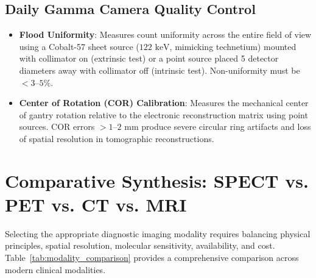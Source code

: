 \documentclass[11pt,a4paper]{article}
\begin{document}
\subsection{Daily Gamma Camera Quality Control}
\begin{itemize}
    \item \textbf{Flood Uniformity}: Measures count uniformity across the entire field of view using a Cobalt-57 sheet source ($122\text{ keV}$, mimicking technetium) mounted with collimator on (extrinsic test) or a point source placed 5 detector diameters away with collimator off (intrinsic test). Non-uniformity must be $<3\text{--}5\%$.
    \item \textbf{Center of Rotation (COR) Calibration}: Measures the mechanical center of gantry rotation relative to the electronic reconstruction matrix using point sources. COR errors $>1\text{--}2\text{ mm}$ produce severe circular ring artifacts and loss of spatial resolution in tomographic reconstructions.
\end{itemize}

\section{Comparative Synthesis: SPECT vs. PET vs. CT vs. MRI}

Selecting the appropriate diagnostic imaging modality requires balancing physical principles, spatial resolution, molecular sensitivity, availability, and cost. Table~\ref{tab:modality_comparison} provides a comprehensive comparison across modern clinical modalities.
\end{document}
